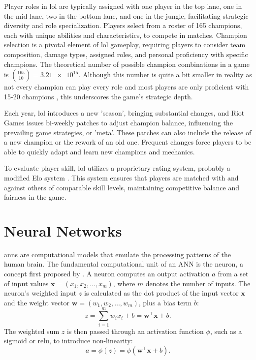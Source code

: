 \documentclass[12pt, a4paper, headinclude, twoside, plainheadsepline, open=right, numbers=noenddot, hidelinks, toc=listof, toc=bibliography]{scrreprt}
\begin{document}
Player roles in \ac{lol} are typically assigned with one player in the top lane, one in the mid lane, two in the bottom lane, and one in the jungle, facilitating strategic diversity and role specialization.
Players select from a roster of 165 champions, each with unique abilities and characteristics, to compete in matches.
Champion selection is a pivotal element of \ac{lol} gameplay, requiring players to consider team composition, damage types, assigned roles, and personal proficiency with specific champions. 
The theoretical number of possible champion combinations in a game is $\binom{165}{10} = \num{3.21e15}$.
Although this number is quite a bit smaller in reality as not every champion can play every role and most players are only proficient with 15-20 champions \cite{2022Recap}, this underscores the game's strategic depth.

Each year, \ac{lol} introduces a new 'season', bringing substantial changes, and Riot Games issues bi-weekly patches to adjust champion balance, influencing the prevailing game strategies, or 'meta'.
These patches can also include the release of a new champion or the rework of an old one.
Frequent changes force players to be able to quickly adapt and learn new champions and mechanics.

To evaluate player skill, \ac{lol} utilizes a proprietary rating system, probably a modified Elo system \cite{janssonNeuralNetworksStandardizing2022}.
This system ensures that players are matched with and against others of comparable skill levels, maintaining competitive balance and fairness in the game.


\section{Neural Networks}
\label{sec:nn}

\Acp{ann} are computational models that emulate the processing patterns of the human brain. The fundamental computational unit of an ANN is the neuron, a concept first proposed by \citeauthor{mccullochLogicalCalculusIdeas1943} \cite{mccullochLogicalCalculusIdeas1943}.
A neuron computes an output activation $a$ from a set of input values $\mathbf{x} = (x_1, x_2, \ldots, x_m)$, where $m$ denotes the number of inputs. 
The neuron's weighted input $z$ is calculated as the dot product of the input vector $\mathbf{x}$ and the weight vector $\mathbf{w} = (w_1, w_2, \ldots, w_m)$, plus a bias term $b$:
\begin{equation}
z = \sum_{i=1}^{m} w_i x_i + b = \mathbf{w}^\top \mathbf{x} + b.
\end{equation}
The weighted sum $z$ is then passed through an activation function $\phi$, such as a sigmoid or \ac{relu}, to introduce non-linearity:
\begin{equation}
a = \phi(z) = \phi(\mathbf{w}^\top \mathbf{x} + b).
\end{equation}
\end{document}
